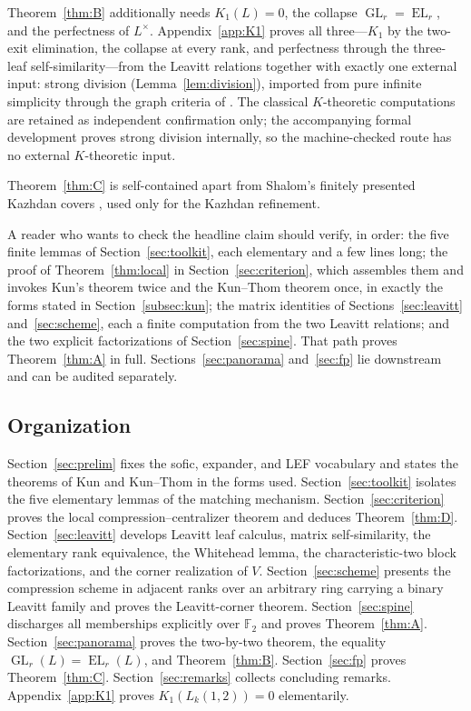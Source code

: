 \documentclass[11pt]{amsart}
\theoremstyle{definition}
\theoremstyle{plain}
\newcommand{\F}{\mathbb F}
\newcommand{\GL}{\operatorname{GL}}
\newcommand{\EL}{\operatorname{EL}}
\begin{document}
Theorem~\ref{thm:B} additionally needs \(K_1(L)=0\), the collapse \(\GL_r=\EL_r\), and the perfectness of \(L^\times\).  Appendix~\ref{app:K1} proves all three---\(K_1\) by the two-exit elimination, the collapse at every rank, and perfectness through the three-leaf self-similarity---from the Leavitt relations together with exactly one external input: strong division (Lemma~\ref{lem:division}), imported from pure infinite simplicity through the graph criteria of \cite{AbramsAranda06}.  The classical \(K\)-theoretic computations \cite{AraGoodearlPardo02,AraBrustengaCortinas09} are retained as independent confirmation only; the accompanying formal development proves strong division internally, so the machine-checked route has no external \(K\)-theoretic input.

Theorem~\ref{thm:C} is self-contained apart from Shalom's finitely presented Kazhdan covers \cite{Shalom00}, used only for the Kazhdan refinement.

A reader who wants to check the headline claim should verify, in order: the five finite lemmas of Section~\ref{sec:toolkit}, each elementary and a few lines long; the proof of Theorem~\ref{thm:local} in Section~\ref{sec:criterion}, which assembles them and invokes Kun's theorem twice and the Kun--Thom theorem once, in exactly the forms stated in Section~\ref{subsec:kun}; the matrix identities of Sections~\ref{sec:leavitt} and~\ref{sec:scheme}, each a finite computation from the two Leavitt relations; and the two explicit factorizations of Section~\ref{sec:spine}.  That path proves Theorem~\ref{thm:A} in full.  Sections~\ref{sec:panorama} and~\ref{sec:fp} lie downstream and can be audited separately.

\subsection*{Organization}

Section~\ref{sec:prelim} fixes the sofic, expander, and LEF vocabulary and states the theorems of Kun and Kun--Thom in the forms used.  Section~\ref{sec:toolkit} isolates the five elementary lemmas of the matching mechanism.  Section~\ref{sec:criterion} proves the local compression--centralizer theorem and deduces Theorem~\ref{thm:D}.  Section~\ref{sec:leavitt} develops Leavitt leaf calculus, matrix self-similarity, the elementary rank equivalence, the Whitehead lemma, the characteristic-two block factorizations, and the corner realization of \(V\).  Section~\ref{sec:scheme} presents the compression scheme in adjacent ranks over an arbitrary ring carrying a binary Leavitt family and proves the Leavitt-corner theorem.  Section~\ref{sec:spine} discharges all memberships explicitly over \(\F_2\) and proves Theorem~\ref{thm:A}.  Section~\ref{sec:panorama} proves the two-by-two theorem, the equality \(\GL_r(L)=\EL_r(L)\), and Theorem~\ref{thm:B}.  Section~\ref{sec:fp} proves Theorem~\ref{thm:C}.  Section~\ref{sec:remarks} collects concluding remarks.  Appendix~\ref{app:K1} proves \(K_1(L_k(1,2))=0\) elementarily.
\end{document}
